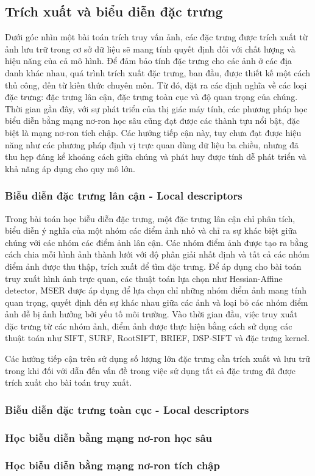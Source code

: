 \subsection{Trích xuất và biểu diễn đặc trưng}

Dưới góc nhìn một bài toán trích truy vấn ảnh, các đặc trưng được trích xuất từ ảnh lưu trữ trong cơ sở dữ liệu sẽ mang tính quyết định đối với chất lượng và hiệu năng của cả mô hình. Để đảm bảo tính đặc trưng cho các ảnh ở các địa danh khác nhau, quá trình trích xuất đặc trưng, ban đầu, được thiết kế một cách thủ công, đến từ kiến thức chuyên môn. Từ đó, đặt ra các định nghĩa về các loại đặc trưng: đặc trưng lân cận, đặc trưng toàn cục và độ quan trọng của chúng. Thời gian gần đây, với sự phát triển của thị giác máy tính, các phương pháp học biểu diễn bằng mạng nơ-ron học sâu cũng đạt được các thành tựu nổi bật, đặc biệt là mạng nơ-ron tích chập. Các hướng tiếp cận này, tuy chưa đạt được hiệu năng như các phương pháp định vị trực quan dùng dữ liệu ba chiều, nhưng đã thu hẹp đáng kể khoảng cách giữa chúng và phát huy được tính dễ phát triển và khả năng áp dụng cho quy mô lớn.

\subsubsection{Biễu diễn đặc trưng lân cận  - Local descriptors}

Trong bài toán học biễu diễn đặc trưng, một đặc trưng lân cận chỉ phân tích, biểu diễn ý nghĩa của một nhóm các điểm ảnh nhỏ và chỉ ra sự khác biệt giữa chúng với các nhóm các điểm ảnh lân cận\cite{CGV-017-localdescriptors}. Các nhóm điểm ảnh được tạo ra bằng cách chia mỗi hình ảnh thành lưới với độ phân giải nhất định và tất cả các nhóm điểm ảnh được thu thập, trích xuất để tìm đặc trưng. Để áp dụng cho bài toán truy xuất hình ảnh trực quan, các thuật toán lựa chọn như Hessian-Affine detector\cite{hessian-affine-detector}, MSER\cite{MSER-detector} được áp dụng để lựa chọn chỉ những nhóm điểm ảnh mang tính quan trọng, quyết định đến sự khác nhau giữa các ảnh và loại bỏ các nhóm điểm ảnh dễ bị ảnh hưởng bởi yếu tố môi trường. Vào thời gian đầu, việc truy xuất đặc trưng từ các nhóm ảnh, điểm ảnh được thực hiện bằng cách sử dụng các thuật toán như SIFT\cite{lowe1999object}, SURF\cite{bay2006surf}, RootSIFT\cite{Arandjelovi2012ThreeTE}, BRIEF\cite{brief}, DSP-SIFT\cite{Dong2014DomainsizePI} và đặc trưng kernel\cite{kernel-descriptors}.

Các hướng tiếp cận trên sử dụng số lượng lớn đặc trưng cần trích xuất và lưu trữ trong khi đối với  dẫn đến vấn đề trong việc sử dụng tất cả đặc trưng đã được trích xuất cho bài toán truy xuất.

\subsubsection{Biễu diễn đặc trưng toàn cục  - Local descriptors}

\subsubsection{Học biễu diễn bằng mạng nơ-ron học sâu}

\subsubsection{Học biễu diễn bằng mạng nơ-ron tích chập}
